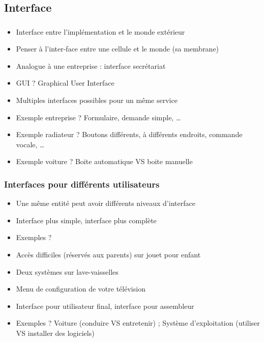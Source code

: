 \documentclass[english, french]{beamer}
\begin{document}
\subsection{Interface}
\begin{frame}
	\frametitle{\subsecname}
	\begin{itemize}
		\item Interface entre l’implémentation et le monde extérieur
		\item Penser à l’inter-face entre une cellule et le monde (sa membrane)
		\item Analogue à une entreprise : interface secrétariat
		\item GUI ? \pause Graphical User Interface
		\item Multiples interfaces possibles pour un même service
		\item Exemple entreprise ? \pause Formulaire, demande simple, …
		\item Exemple radiateur ? \pause Boutons différents, à différents endroits, commande vocale, …
		\item Exemple voiture ? \pause Boite automatique VS boite manuelle
	\end{itemize}
\end{frame}

\begin{frame}
	\frametitle{Interfaces pour différents utilisateurs}
	\begin{itemize}
		\item Une même entité peut avoir différents niveaux d’interface
		\item Interface plus simple, interface plus complète
		\item Exemples ? \pause 
		\item Accès difficiles (réservés aux parents) sur jouet pour enfant
		\item Deux systèmes sur lave-vaisselles
		\item Menu de configuration de votre télévision
		\item Interface pour utilisateur final, interface pour assembleur
		\item Exemples ? \pause Voiture (conduire VS entretenir) ; Système d’exploitation (utiliser VS installer des logiciels)
	\end{itemize}
\end{frame}
\end{document}
